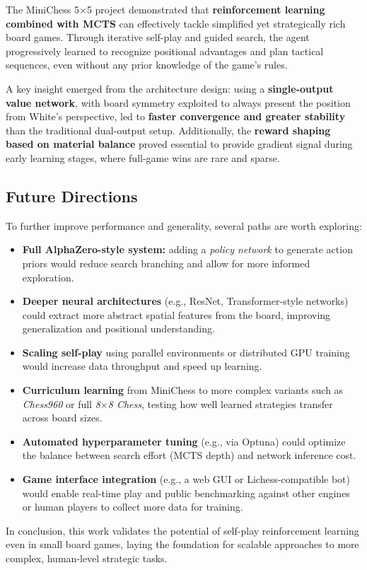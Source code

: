 \documentclass{report}
\begin{document}
The MiniChess 5$\times$5 project demonstrated that \textbf{reinforcement learning combined with MCTS} can effectively tackle simplified yet strategically rich board games.  
Through iterative self-play and guided search, the agent progressively learned to recognize positional advantages and plan tactical sequences, even without any prior knowledge of the game’s rules.
 
A key insight emerged from the architecture design: using a \textbf{single-output value network}, with board symmetry exploited to always present the position from White's perspective, led to \textbf{faster convergence and greater stability} than the traditional dual-output setup.  
Additionally, the \textbf{reward shaping based on material balance} proved essential to provide gradient signal during early learning stages, where full-game wins are rare and sparse.
 
\subsection*{Future Directions}
 
To further improve performance and generality, several paths are worth exploring:
 
\begin{itemize}
  \item \textbf{Full AlphaZero-style system:} adding a \textit{policy network} to generate action priors would reduce search branching and allow for more informed exploration.
  \item \textbf{Deeper neural architectures} (e.g., ResNet, Transformer-style networks) could extract more abstract spatial features from the board, improving generalization and positional understanding.
  \item \textbf{Scaling self-play} using parallel environments or distributed GPU training would increase data throughput and speed up learning.
  \item \textbf{Curriculum learning} from MiniChess to more complex variants such as \textit{Chess960} or full \textit{8$\times$8 Chess}, testing how well learned strategies transfer across board sizes.
  \item \textbf{Automated hyperparameter tuning} (e.g., via Optuna) could optimize the balance between search effort (MCTS depth) and network inference cost.
  \item \textbf{Game interface integration} (e.g., a web GUI or Lichess-compatible bot) would enable real-time play and public benchmarking against other engines or human players to collect more data for training.
\end{itemize}
 
\noindent In conclusion, this work validates the potential of self-play reinforcement learning even in small board games, laying the foundation for scalable approaches to more complex, human-level strategic tasks.
\end{document}
